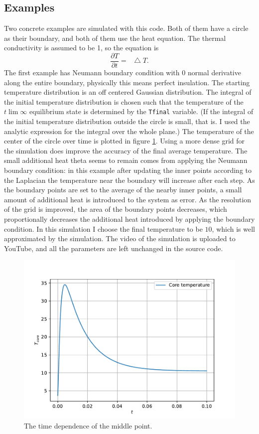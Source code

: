 \documentclass[pdftex,12pt,a4paper]{article}
\newcommand*\Laplace{\mathop{}\!\mathbin\bigtriangleup}
\begin{document}
	\subsection{Examples}
		Two concrete examples are simulated with this code. Both of them have a circle as their boundary, and both of them use the heat equation. The thermal conductivity is assumed to be 1, so the equation is
		\begin{equation}
			\frac{\partial T}{\partial t} = \Laplace T.
		\end{equation}
		The first example has Neumann boundary condition with 0 normal derivative along the entire boundary, physically this means perfect insulation. The starting temperature distribution is an off centered Gaussian distribution. The integral of the initial temperature distribution is chosen such that the temperature of the $t\lim\infty$ equilibrium state is determined by the \texttt{Tfinal} variable. (If the integral of the initial temperature distribution outside the circle is small, that is. I used the analytic expression for the integral over the whole plane.) The temperature of the center of the circle over time is plotted in figure \ref{timepdf}. Using a more dense grid for the simulation does improve the accuracy of the final average temperature. The small additional heat theta seems to remain comes from applying the Neumann boundary condition: in this example after updating the inner points according to the Laplacian the temperature near the boundary will increase after each step. As the boundary points are set to the average of the nearby inner points, a small amount of additional heat is introduced to the system as error. As the resolution of the grid is improved, the area of the boundary points decreases, which proportionally decreases the additional heat introduced by applying the boundary condition. In this simulation I choose the final temperature to be $10$, which is well approximated by the simulation. The video of the simulation is uploaded to YouTube, and all the parameters are left unchanged in the source code. \cite{Gaussian}
		\begin{figure}[H]
			\centering
			\includegraphics[scale=1]{./figs/time.pdf}
			\caption{The time dependence of the middle point.}
			\label{timepdf}
		\end{figure}
\end{document}

